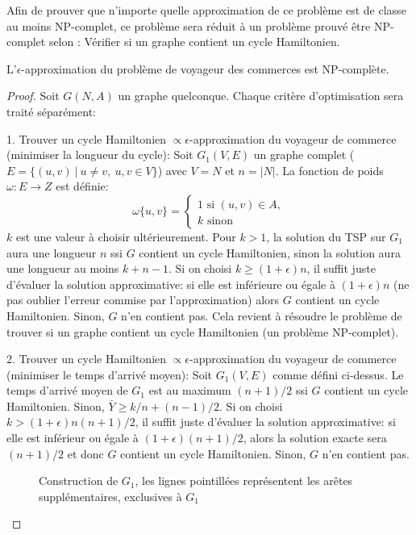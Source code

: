 \documentclass[../main.tex]{subfiles}
\begin{document}
Afin de prouver que n'importe quelle approximation de ce problème est de classe au moins NP-complet, ce problème sera réduit à un problème prouvé être NP-complet selon \cite{Karp1972}: Vérifier si un graphe contient un cycle Hamiltonien.

\begin{theorem}
L'$\epsilon$-approximation du problème de voyageur des commerces est NP-complète.
\end{theorem}

\begin{proof}
Soit $G(N,A)$ un graphe quelconque. Chaque critère d'optimisation sera traité séparément:

1. Trouver un cycle Hamiltonien $\propto \! \epsilon$-approximation du voyageur de commerce (minimiser la longueur du cycle): Soit $G_1(V, E)$ un graphe complet ($E = \{(u,v)\ |\ u \neq v,\ u,v \in V\}$) avec $V = N$ et $n = |N|$. La fonction de poids $\omega : E \rightarrow Z$ est définie:
\[
\omega \{u, v\} = \begin{cases}
\text{1 si } (u,v)\in A,\\
k \text{ sinon}
\end{cases}
\]
$k$ est une valeur à choisir ultérieurement. Pour $k > 1$, la solution du TSP sur $G_1$ aura une longueur $n$ ssi $G$ contient un cycle Hamiltonien, sinon la solution aura une longueur au moins $k + n -1$. Si on choisi $k \geq (1+\epsilon)n$, il suffit juste d'évaluer la solution approximative: si elle est inférieure ou égale à $(1+ \epsilon)n$ (ne pas oublier l'erreur commise par l'approximation) alors $G$ contient un cycle Hamiltonien. Sinon, $G$ n'en contient pas. Cela revient à résoudre le problème de trouver si un graphe contient un cycle Hamiltonien (un problème NP-complet).

2. Trouver un cycle Hamiltonien $\propto \! \epsilon$-approximation du voyageur de commerce (minimiser le temps d'arrivé moyen): Soit $G_1(V,E)$ comme défini ci-dessus. Le temps d'arrivé moyen de $G_1$ est au maximum $(n+1)/2$ ssi $G$ contient un cycle Hamiltonien. Sinon, $\bar{Y} \geq k/n + (n-1)/2$. Si on choisi $k > (1+\epsilon)n(n+1)/2$, il suffit juste d'évaluer la solution approximative: si elle est inférieur ou égale à $(1+\epsilon)(n+1)/2$, alors la solution exacte sera $(n+1)/2$ et donc $G$ contient un cycle Hamiltonien. Sinon, $G$ n'en contient pas.

\begin{figure}[ht]
    \centering
    \caption{Construction de $G_1$, les lignes pointillées représentent les arêtes supplémentaires, exclusives à $G_1$}
    \label{fig:epsi_approx}
\end{figure}


\end{proof}
\end{document}
